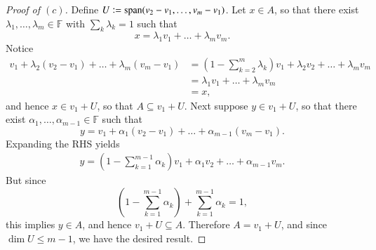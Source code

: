 \documentclass{extarticle}
\newcommand{\F}{\mathbb{F}}
\DeclareMathOperator{\Span}{span}
\newcommand{\defeq}{\vcentcolon=}
\begin{document}
\begin{proof}[Proof of $(c)$]
Define $U \defeq \Span(v_2 - v_1, \dots, v_m - v_1)$.  Let $x\in A$, so that there exist $\lambda_1,\dots, \lambda_m\in\F$ with $\sum_k\lambda_k = 1$ such that
\begin{equation*}
x = \lambda_1v_1 + \dots + \lambda_mv_m.
\end{equation*}
Notice
\begin{align*}
v_1 + \lambda_2(v_2 - v_1) + \dots + \lambda_m(v_m - v_1) &= \left(1 - \sum_{k = 2}^m\lambda_k\right)v_1 + \lambda_2v_2 + \dots + \lambda_mv_m\\
&= \lambda_1v_1 + \dots +\lambda_mv_m\\
&= x,
\end{align*}
and hence $x\in v_1 + U$, so that $A\subseteq v_1 + U$.  Next suppose $y\in v_1 + U$, so that there exist $\alpha_1,\dots,\alpha_{m - 1}\in\F$ such that
\begin{equation*}
y = v_1 + \alpha_1(v_2 - v_1) + \dots + \alpha_{m - 1}(v_m - v_1).
\end{equation*}
Expanding the RHS yields
\begin{align*}
y = \left(1 - \sum_{k = 1}^{m-1}\alpha_k\right)v_1 + \alpha_1v_2 + \dots + \alpha_{m-1}v_m.
\end{align*}
But since 
\begin{equation*}
\left(1 - \sum_{k = 1}^{m-1}\alpha_k\right)+ \sum_{k=1}^{m-1}\alpha_k = 1,
\end{equation*}
this implies $y \in A$, and hence $v_1 + U\subseteq A$.  Therefore $A = v_1 + U$, and since $\dim U \leq m - 1$, we have the desired result.
\end{proof}
\end{document}
